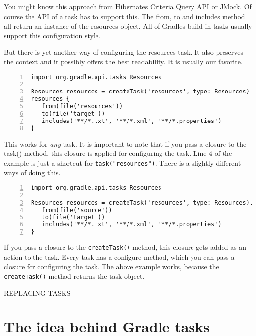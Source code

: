 You might know this approach from Hibernates Criteria Query API or JMock. Of course the API of a task has to support this. The from, to and includes method all return an instance of the resources object. All of Gradles build-in tasks usually support this configuration style.

But there is yet another way of configuring the resources task. It also preserves the context and it possibly offers the best readability. It is usually our favorite.

\begin{Verbatim}[numbers=left]
import org.gradle.api.tasks.Resources

Resources resources = createTask('resources', type: Resources)
resources {
   from(file('resources'))
   to(file('target'))
   includes('**/*.txt', '**/*.xml', '**/*.properties')
}
\end{Verbatim}

This works for \emph{any} task. It is important to note that if you pass a closure to the task() method, this closure is applied for configuring the task. Line 4 of the example is just a shortcut for \texttt{task("resources")}. There is a slightly different ways of doing this.

\begin{Verbatim}[numbers=left]
import org.gradle.api.tasks.Resources

Resources resources = createTask('resources', type: Resources).configure {
   from(file('source'))
   to(file('target'))
   includes('**/*.txt', '**/*.xml', '**/*.properties')
}	
\end{Verbatim}

If you pass a closure to the \texttt{createTask()} method, this closure gets added as an action to the task. Every task has a configure method, which you can pass a closure for configuring the task. The above example works, because the \texttt{createTask()} method returns the task object.

REPLACING TASKS
\section{The idea behind Gradle tasks} %
\label{sec:the_idea_behind_gradle_tasks}

